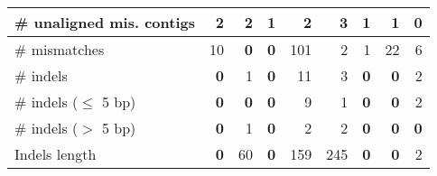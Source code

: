 \documentclass[12pt,a4paper]{article}
\begin{document}
\begin{table}[ht]
\begin{center}
\begin{tabular}{|l*{8}{|r}|}
\# unaligned mis. contigs & 2 & 2 & 1 & 2 & 3 & 1 & 1 & {\bf 0} \\ \hline
\# mismatches & 10 & {\bf 0} & {\bf 0} & 101 & 2 & 1 & 22 & 6 \\ \hline
\# indels & {\bf 0} & 1 & {\bf 0} & 11 & 3 & {\bf 0} & {\bf 0} & 2 \\ \hline
\hspace{5mm}\# indels ($\leq$ 5 bp) & {\bf 0} & {\bf 0} & {\bf 0} & 9 & 1 & {\bf 0} & {\bf 0} & 2 \\ \hline
\hspace{5mm}\# indels ($>$ 5 bp) & {\bf 0} & 1 & {\bf 0} & 2 & 2 & {\bf 0} & {\bf 0} & {\bf 0} \\ \hline
Indels length & {\bf 0} & 60 & {\bf 0} & 159 & 245 & {\bf 0} & {\bf 0} & 2 \\ \hline
\end{tabular}
\end{center}
\end{table}
\end{document}
